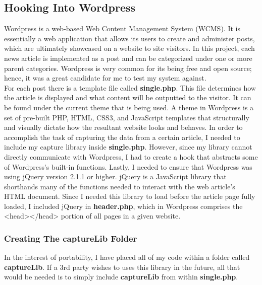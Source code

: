 \documentclass[12pt]{article}
\begin{document}
{\subsection{Hooking Into Wordpress}
Wordpress is a web-based Web Content Management System (WCMS). It is essentially a web application that allows its users to create and administer posts, which are ultimately showcased on a website to site visitors. In this project, each news article is implemented as a post and can be categorized under one or more parent categories. Wordpress is very common for its being free and open source; hence, it was a great candidate for me to test my system against. \\
For each post there is a template file called \textbf{single.php}. This file determines how the article is displayed and what content will be outputted to the visitor. It can be found under the current theme that is being used. A theme in Wordpress is a set of pre-built PHP, HTML, CSS3, and JavaScript templates that structurally and visually dictate how the resultant website looks and behaves. In order to accomplish the task of capturing the data from a certain article, I needed to include my capture library inside \textbf{single.php}. However, since my library cannot directly communicate with Wordpress, I had to create a hook that abstracts some of Wordpress's built-in functions. Lastly, I needed to ensure that Wordpress was using jQuery version 2.1.1 or higher. jQuery is a JavaScript library that shorthands many of the functions needed to interact with the web article's HTML document. Since I needed this library to load before the article page fully loaded, I included jQuery in \textbf{header.php}, which in Wordpress comprises the <head></head> portion of all pages in a given website. 

\newpage 

\subsubsection{Creating The captureLib Folder} 
In the interest of portability, I have placed all of my code within a folder called \textbf{captureLib}. If a 3rd party wishes to uses this library in the future, all that would be needed is to simply include \textbf{captureLib} from within \textbf{single.php}. \\


}
\end{document}
